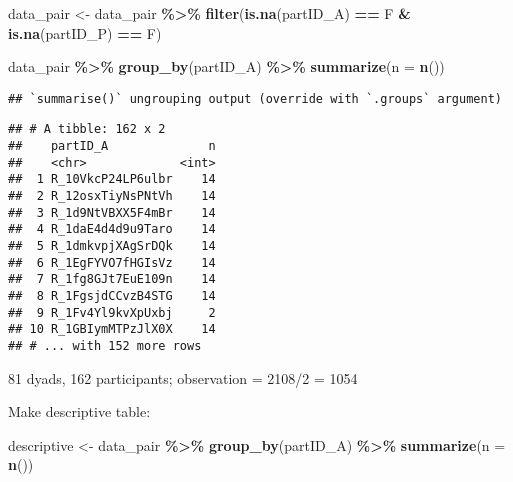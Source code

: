 \documentclass[
]{article}
\newenvironment{Shaded}{\begin{snugshade}}{\end{snugshade}}
\newcommand{\DataTypeTok}[1]{\textcolor[rgb]{0.13,0.29,0.53}{#1}}
\newcommand{\KeywordTok}[1]{\textcolor[rgb]{0.13,0.29,0.53}{\textbf{#1}}}
\newcommand{\NormalTok}[1]{#1}
\newcommand{\OperatorTok}[1]{\textcolor[rgb]{0.81,0.36,0.00}{\textbf{#1}}}
\newcommand{\StringTok}[1]{\textcolor[rgb]{0.31,0.60,0.02}{#1}}
\begin{document}
\begin{Shaded}
\begin{Highlighting}[]
\NormalTok{data\_pair \textless{}{-}}\StringTok{ }\NormalTok{data\_pair }\OperatorTok{\%\textgreater{}\%}
\StringTok{  }\KeywordTok{filter}\NormalTok{(}\KeywordTok{is.na}\NormalTok{(partID\_A) }\OperatorTok{==}\StringTok{ }\NormalTok{F }\OperatorTok{\&}\StringTok{ }\KeywordTok{is.na}\NormalTok{(partID\_P) }\OperatorTok{==}\StringTok{ }\NormalTok{F)}
\end{Highlighting}
\end{Shaded}

\begin{Shaded}
\begin{Highlighting}[]
\NormalTok{data\_pair }\OperatorTok{\%\textgreater{}\%}
\StringTok{  }\KeywordTok{group\_by}\NormalTok{(partID\_A) }\OperatorTok{\%\textgreater{}\%}
\StringTok{  }\KeywordTok{summarize}\NormalTok{(}\DataTypeTok{n =} \KeywordTok{n}\NormalTok{())}
\end{Highlighting}
\end{Shaded}

\begin{verbatim}
## `summarise()` ungrouping output (override with `.groups` argument)
\end{verbatim}

\begin{verbatim}
## # A tibble: 162 x 2
##    partID_A              n
##    <chr>             <int>
##  1 R_10VkcP24LP6ulbr    14
##  2 R_12osxTiyNsPNtVh    14
##  3 R_1d9NtVBXX5F4mBr    14
##  4 R_1daE4d4d9u9Taro    14
##  5 R_1dmkvpjXAgSrDQk    14
##  6 R_1EgFYVO7fHGIsVz    14
##  7 R_1fg8GJt7EuE109n    14
##  8 R_1FgsjdCCvzB4STG    14
##  9 R_1Fv4Yl9kvXpUxbj     2
## 10 R_1GBIymMTPzJlX0X    14
## # ... with 152 more rows
\end{verbatim}

81 dyads, 162 participants; observation = 2108/2 = 1054

Make descriptive table:

\begin{Shaded}
\begin{Highlighting}[]
\NormalTok{descriptive \textless{}{-}}\StringTok{ }\NormalTok{data\_pair }\OperatorTok{\%\textgreater{}\%}
\StringTok{  }\KeywordTok{group\_by}\NormalTok{(partID\_A) }\OperatorTok{\%\textgreater{}\%}
\StringTok{  }\KeywordTok{summarize}\NormalTok{(}\DataTypeTok{n =} \KeywordTok{n}\NormalTok{())}
\end{Highlighting}
\end{Shaded}
\end{document}
